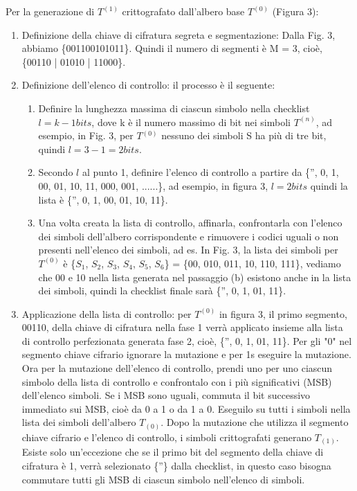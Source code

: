 \documentclass[a4paper]{report} %
\begin{document}
Per la generazione di $T^(1)$ crittografato dall'albero base $T^{(0)}$ (Figura 3):
\begin{enumerate}
\item Definizione della chiave di cifratura segreta e segmentazione:
Dalla Fig. 3, abbiamo \{001100101011\}. Quindi il numero di segmenti è M = 3, cioè, \{00110 | 01010 | 11000\}.
\item Definizione dell'elenco di controllo: il processo è il seguente:

\begin{enumerate}
\item Definire la lunghezza massima di ciascun simbolo nella checklist $l = k -1 bits$, dove k è il numero massimo di bit nei simboli $T^{(n)}$, ad esempio, in Fig. 3, per $T{^(0)}$ nessuno dei simboli S ha più di tre bit, quindi $l = 3 -1 = 2 bits$. 
\item Secondo $l$ al punto 1, definire l'elenco di controllo a partire da \{'', 0, 1, 00, 01, 10, 11, 000, 001, ......\}, ad esempio, in figura 3, $l = 2 bits$ quindi la lista è \{'', 0, 1, 00, 01, 10, 11\}.
\item Una volta creata la lista di controllo, affinarla, confrontarla con l'elenco dei simboli dell'albero corrispondente e rimuovere i codici uguali o non presenti nell'elenco dei simboli, ad es. In Fig. 3, la lista dei simboli per $T^{(0)}$ è \{$S_1$, $S_2$, $S_3$, $S_4$, $S_5$, $S_6$\} = \{00, 010, 011, 10, 110, 111\}, vediamo che 00 e 10 nella lista generata nel passaggio (b) esistono anche in la lista dei simboli, quindi la checklist finale sarà \{'', 0, 1, 01, 11\}.
\end{enumerate}

\item Applicazione della lista di controllo: per $T^{(0)}$ in figura 3, il primo segmento, 00110, della chiave di cifratura nella fase 1 verrà applicato insieme alla lista di controllo perfezionata generata fase 2, cioè, \{'', 0, 1, 01, 11\}. Per gli "0" nel segmento chiave cifrario ignorare la mutazione e per 1s eseguire la mutazione. Ora per la mutazione dell'elenco di controllo, prendi uno per uno ciascun simbolo della lista di controllo e confrontalo con i più significativi (MSB) dell'elenco simboli. Se i MSB sono uguali, commuta il bit successivo immediato sui MSB, cioè da 0 a 1 o da 1 a 0. Eseguilo su tutti i simboli nella lista dei simboli dell'albero $T_{(0)}$. Dopo la mutazione che utilizza il segmento chiave cifrario e l'elenco di controllo, i simboli crittografati generano $T_{(1)}$. Esiste solo un'eccezione che se il primo bit del segmento della chiave di cifratura è 1, verrà selezionato \{''\} dalla checklist, in questo caso bisogna commutare tutti gli MSB di ciascun simbolo nell'elenco di simboli.


\end{enumerate}
\end{document}
